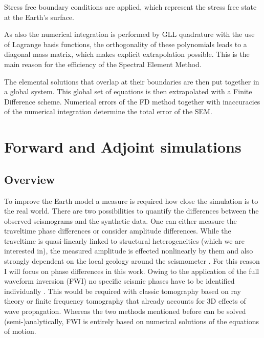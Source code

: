 Stress free boundary conditions are applied, which represent the stress free state at the Earth's surface. 

As also the numerical integration is performed by GLL quadrature with the use of Lagrange basis functions, the orthogonality of these polynomials 
leads to a diagonal mass matrix, which makes explicit extrapolation possible. This is the main reason for the efficiency of the Spectral Element Method.

The elemental solutions that overlap at their boundaries are then put together in a global system. 
This global set of equations is then extrapolated with a Finite Difference scheme.
Numerical errors of the FD method together with inaccuracies of the numerical integration determine the total error of the SEM.



\section{Forward and Adjoint simulations}


\subsection{Overview}
To improve the Earth model a measure is required how close the simulation is to the real world. 
There are two possibilities to quantify the differences between the observed seismograms and the synthetic data.
One can either measure the traveltime phase differences or consider amplitude differences.
While the traveltime is quasi-linearly linked to structural heterogeneities (which we are interested in),
the measured amplitude is effected nonlinearly by them and also strongly dependent on the local geology 
around the seismometer \citep{Fichtner2008}.
For this reason I will focus on phase differences in this work.
Owing to the application of the full waveform inversion (FWI) no specific seismic phases have to be identified 
individually \citep{Fichtner2011a}. 
This would be required with classic tomography based on ray theory or finite frequency tomography that already 
accounts for 3D effects of wave propagation. %
Whereas the two methods mentioned before can be solved (semi-)analytically, FWI is entirely based on numerical
solutions of the equations of motion.

